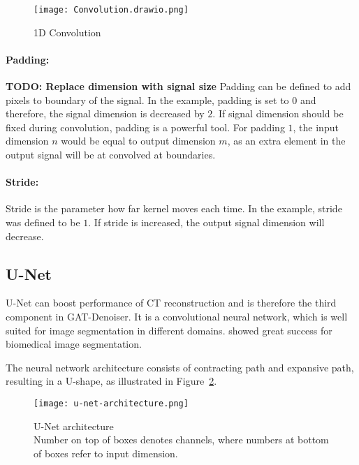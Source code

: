\begin{figure}[H]
  \centering
  \texttt{[image: Convolution.drawio.png]}
  \caption{1D Convolution}
  \label{fig:1d-convolution}
\end{figure}

\paragraph{Padding:} 

\textbf{TODO: Replace dimension with signal size}
Padding can be defined to add pixels to boundary of the signal.
In the example, padding is set to $0$ and therefore, the signal dimension is decreased by $2$.
If signal dimension should be fixed during convolution, padding is a powerful tool. For padding $1$,
the input dimension $n$ would be equal to output dimension $m$, as an extra element in the output signal
will be at convolved at boundaries.


\paragraph{Stride:}
Stride is the parameter how far kernel moves each time. In the example, stride was defined to be $1$.
If stride is increased, the output signal dimension will decrease.


\subsection{U-Net}
\label{sec:unet}
U-Net can boost performance of CT reconstruction and is therefore the third component
in GAT-Denoiser.
It is a convolutional neural network, which is well suited for image segmentation in different domains.
\cite{unet-tomography} showed great success for biomedical image segmentation.

The neural network architecture consists of contracting path and expansive path,
resulting in a U-shape, as illustrated in Figure~\ref{fig:u-net-architectue}.

\begin{figure}[H]
  \centering
  \texttt{[image: u-net-architecture.png]}
  \caption{
    U-Net architecture \cite[p 2, Fig. 1]{unet-tomography} \\
    Number on top of boxes denotes channels, where numbers at bottom of boxes refer to input dimension.
    }
    \label{fig:u-net-architectue}
\end{figure}


